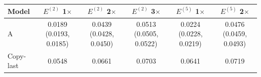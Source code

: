 \begin{tabular}{lccccc}
\toprule
Model & $E^{(2)}$ 1$\times$ & $E^{(2)}$ 2$\times$ & $E^{(2)}$ 3$\times$ & $E^{(5)}$ 1$\times$ & $E^{(5)}$ 2$\times$ \\
\midrule
A & 0.0189 (0.0193, 0.0185) & 0.0439 (0.0428, 0.0450) & 0.0513 (0.0505, 0.0522) & 0.0224 (0.0228, 0.0219) & 0.0476 (0.0459, 0.0493) \\
Copy-last & 0.0548 & 0.0661 & 0.0703 & 0.0641 & 0.0719 \\
\bottomrule
\end{tabular}
